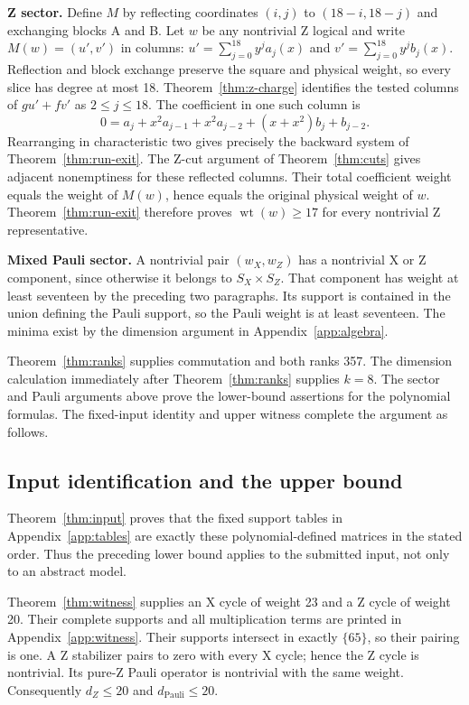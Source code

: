 \documentclass{article}
\DeclareMathOperator{\wt}{wt}
\begin{document}
\textbf{Z sector.} Define \(M\) by reflecting coordinates \((i,j)\) to
\((18 - i, 18 - j)\) and exchanging blocks A and B. Let \(w\) be any nontrivial
Z logical and write \(M(w) = (u', v')\) in columns:
\(u' = \sum_{j=0}^{18} y^j a_j(x)\) and \(v' = \sum_{j=0}^{18} y^j b_j(x)\).
Reflection and block exchange preserve the square and physical weight,
so every slice has degree at most 18. Theorem~\ref{thm:z-charge} identifies the tested
columns of \(gu' + fv'\) as \(2 \le j \le 18\). The coefficient in one such column is
\begin{equation}
  0 = a_j + x^2 a_{j-1} + x^2 a_{j-2} + (x + x^2) b_j + b_{j-2}.
\end{equation}
Rearranging in characteristic two gives precisely the backward system of
Theorem~\ref{thm:run-exit}. The Z-cut argument of Theorem~\ref{thm:cuts} gives adjacent
nonemptiness for these reflected columns. Their total coefficient weight equals the weight
of \(M(w)\), hence equals the original physical weight of \(w\). Theorem~\ref{thm:run-exit}
therefore proves \(\wt(w) \ge 17\) for every nontrivial Z representative.

\textbf{Mixed Pauli sector.} A nontrivial pair \((w_X, w_Z)\) has a nontrivial X or
Z component, since otherwise it belongs to \(S_X \times S_Z\). That component
has weight at least seventeen by the preceding two paragraphs. Its support
is contained in the union defining the Pauli support, so the Pauli weight
is at least seventeen. The minima exist by the dimension argument in
Appendix~\ref{app:algebra}.

Theorem~\ref{thm:ranks} supplies commutation and both ranks 357. The dimension
calculation immediately after Theorem~\ref{thm:ranks} supplies \(k = 8\). The sector and Pauli
arguments above prove the lower-bound assertions for the polynomial formulas.
The fixed-input identity and upper witness complete the argument as follows.

\subsection{Input identification and the upper bound}\label{sec:input-upper}

Theorem~\ref{thm:input} proves that the fixed support tables in Appendix~\ref{app:tables} are
exactly these polynomial-defined matrices in the stated order. Thus the preceding
lower bound applies to the submitted input, not only to an abstract model.

Theorem~\ref{thm:witness} supplies an X cycle of weight 23 and a Z cycle of weight 20.
Their complete supports and all multiplication terms are printed in
Appendix~\ref{app:witness}. Their supports intersect in exactly \(\{65\}\), so their pairing
is one. A Z stabilizer pairs to zero with every X cycle; hence the Z cycle
is nontrivial. Its pure-Z Pauli operator is nontrivial with the same weight.
Consequently \(d_Z \le 20\) and \(d_{\mathrm{Pauli}} \le 20\).
\end{document}
